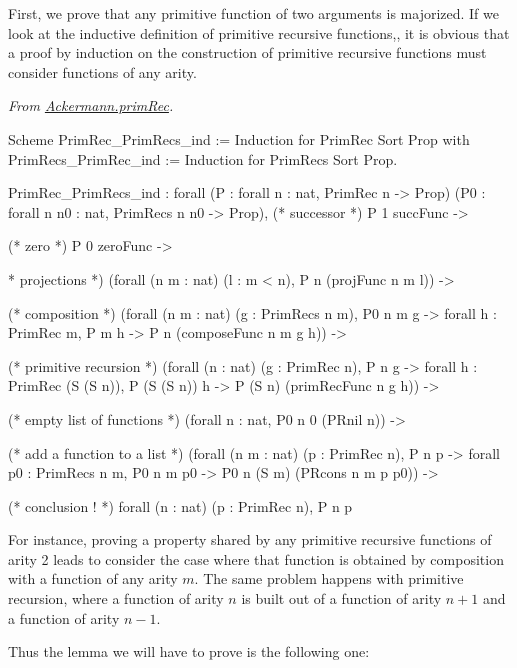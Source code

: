 First, we prove that any primitive function of two arguments is majorized.
If we look at the inductive definition of primitive recursive functions,\pageref{def:Primrec}, it is obvious that a proof by induction on the construction of primitive recursive functions must consider functions of any arity.

\vspace{4pt}
\noindent
\emph{From \href{../theories/html/hydras.Ackermann.primRec.html}{Ackermann.primRec}.}

\begin{Coqsrc}
Scheme PrimRec_PrimRecs_ind := Induction for PrimRec
  Sort Prop
  with PrimRecs_PrimRec_ind := Induction for PrimRecs 
  Sort Prop.
\end{Coqsrc}

\begin{Coqanswer}
PrimRec_PrimRecs_ind :
forall (P : forall n : nat, PrimRec n -> Prop)
  (P0 : forall n n0 : nat, PrimRecs n n0 -> Prop),
(* successor *)
P 1 succFunc ->

(* zero *)
P 0 zeroFunc ->

* projections *)
(forall (n m : nat) (l : m < n), P n (projFunc n m l)) ->

(* composition *) 
(forall (n m : nat) (g : PrimRecs n m),
      P0 n m g -> forall h : PrimRec m, P m h -> 
      P n (composeFunc n m g h)) ->

(* primitive recursion *)
(forall (n : nat) (g : PrimRec n),
 P n g ->
    forall h : PrimRec (S (S n)), P (S (S n)) h -> 
     P (S n) (primRecFunc n g h)) ->

(* empty list of functions *)
(forall n : nat, P0 n 0 (PRnil n)) ->

(* add a function to a list *)
(forall (n m : nat) (p : PrimRec n),
   P n p -> 
   forall p0 : PrimRecs n m, P0 n m p0 -> 
   P0 n (S m) (PRcons n m p p0)) ->

(* conclusion ! *)
forall (n : nat) (p : PrimRec n), P n p
\end{Coqanswer}

For instance, proving a property shared by any primitive recursive functions of arity 2 leads to consider the case where that function is obtained by composition with a function of any 
arity $m$. The same problem happens with primitive 
recursion, where a function of arity $n$ is built out of a function of arity $n+1$ and a function of arity $n-1$.

Thus the lemma we will have to prove is the following one:


